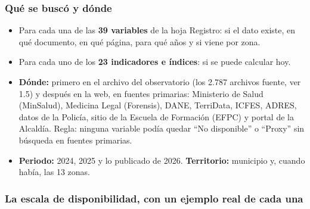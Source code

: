 \documentclass[11pt,letterpaper]{article}
\begin{document}
\subsubsection*{Qué se buscó y dónde}

\begin{itemize}
\item Para cada una de las \textbf{39 variables} de la hoja Registro: si el dato existe, en qué documento, en qué página, para qué años y si viene por zona.
\item Para cada uno de los \textbf{23 indicadores e índices}: si se puede calcular hoy.
\item \textbf{Dónde:} primero en el archivo del observatorio (los 2.787 archivos fuente, ver 1.5) y después en la web, en fuentes primarias: Ministerio de Salud (MinSalud), Medicina Legal (Forensis), DANE, TerriData, ICFES, ADRES, datos de la Policía, sitio de la Escuela de Formación (EFPC) y portal de la Alcaldía. Regla: ninguna variable podía quedar ``No disponible'' o ``Proxy'' sin búsqueda en fuentes primarias.
\item \textbf{Periodo:} 2024, 2025 y lo publicado de 2026. \textbf{Territorio:} municipio y, cuando había, las 13 zonas.
\end{itemize}

\subsubsection*{La escala de disponibilidad, con un ejemplo real de cada una}
\end{document}

